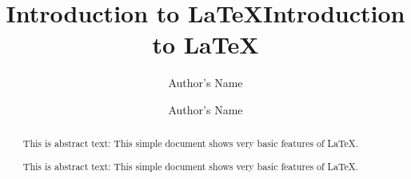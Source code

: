 \documentclass{cs-assignment}
\begin{document}
\title{Introduction to \LaTeX{}}
\author{Author's Name}

\maketitle

\begin{abstract}
This is abstract text: This simple document shows very basic features of
\LaTeX{}.
\end{abstract}

\title{Introduction to \LaTeX{}}
\author{Author's Name}

\maketitle

\begin{abstract}
This is abstract text: This simple document shows very basic features of
\LaTeX{}.
\end{abstract}

\Blinddocument
\end{document}
